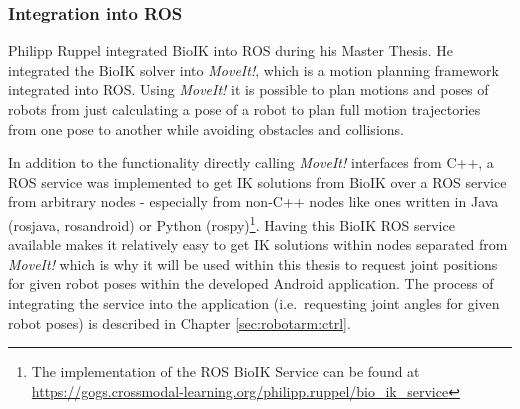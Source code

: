 \subsubsection{Integration into ROS}
Philipp Ruppel integrated BioIK into ROS during his Master Thesis\cite{Ruppel17}. He integrated the BioIK solver into \textit{MoveIt!}, which is a motion planning framework integrated into ROS\cite{Coleman15}. Using \textit{MoveIt!} it is possible to plan motions and poses of robots from just calculating a pose of a robot to plan full motion trajectories from one pose to another while avoiding obstacles and collisions.

In addition to the functionality directly calling \textit{MoveIt!} interfaces from C++, a ROS service was implemented to get IK solutions from BioIK over a ROS service from arbitrary nodes - especially from non-C++ nodes like ones written in Java (rosjava, rosandroid) or Python (rospy)\footnote{The implementation of the ROS BioIK Service can be found at \url{https://gogs.crossmodal-learning.org/philipp.ruppel/bio_ik_service}}. 
Having this BioIK ROS service available makes it relatively easy to get IK solutions within nodes separated from \textit{MoveIt!} which is why it will be used within this thesis to request joint positions for given robot poses within the developed Android application. The process of integrating the service into the application (i.e.~requesting joint angles for given robot poses) is described in Chapter \ref{sec:robotarm:ctrl}.
